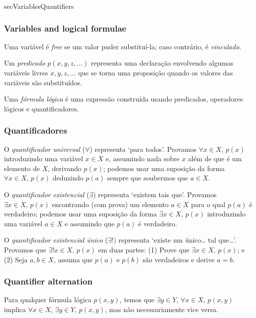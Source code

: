 \begin{tldr}{secVariablesQuantifiers}

\subsubsection*{Variables and logical formulae}

\begin{tldrlist}
Uma variável é \textit{free} se um valor puder substituí-la; caso contrário, é \textit{vinculado}.

Um \textit{predicado} $p(x,y,z,\dots)$ representa uma declaração envolvendo algumas variáveis ​​livres $x,y,z,\dots{}$ que se torna uma proposição quando os valores das variáveis ​​são substituídos.

Uma \textit{fórmula lógica} é uma expressão construída usando predicados, operadores lógicos e quantificadores.
\end{tldrlist}

\subsubsection*{Quantificadores}

\begin{tldrlist}
O \textit{quantificador universal} ($\forall$) representa `para todos'. Provamos $\forall x \in X,\, p(x)$ introduzindo uma variável $x \in X$ e, assumindo nada sobre $x$ além de que é um elemento de $X$, derivando $p (x)$; podemos usar uma suposição da forma $\forall x \in X,\, p(x)$ deduzindo $p(a)$ sempre que soubermos que $a \in X$.

O \textit{quantificador existencial} ($\exists$) representa `existem\pontos{} tais que\pontos{}'. Provamos $\exists x \in X,\, p(x)$ encontrando (com prova) um elemento $a \in X$ para o qual $p(a)$ é verdadeiro; podemos usar uma suposição da forma $\exists x \in X,\, p(x)$ introduzindo uma variável $a \in X$ e assumindo que $p(a)$ é verdadeiro.

O \textit{quantificador existencial único} ($\exists !)$ representa `existe um único\dots{} tal que\dots{}'. Provamos que $\exists! x \in X,\, p(x)$ em duas partes: (1) Prove que $\exists x \in X,\, p(x)$; e (2)
Seja $a,b \in X$, assuma que $p(a)$ e $p(b)$ são verdadeiros e derive $a=b$.
\end{tldrlist}

\subsubsection*{Quantifier alternation}

\begin{tldrlist}
Para qualquer fórmula lógica $p(x,y)$, temos que $\exists y \in Y,\, \forall x \in X,\, p(x,y)$ implica $\forall x \in X ,\, \exists y \in Y,\, p(x,y)$, mas não necessariamente vice versa.
\end{tldrlist}

\end{tldr}
